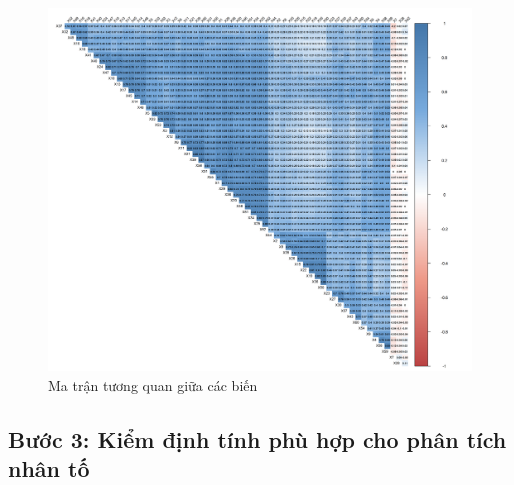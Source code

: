 \begin{figure}[h!]
    \includegraphics[width=\textwidth]{../../assets/images/correlation_matrix_1.png}
    \caption{Ma trận tương quan giữa các biến}
\end{figure}

\subsection{Bước 3: Kiểm định tính phù hợp cho phân tích nhân tố}

